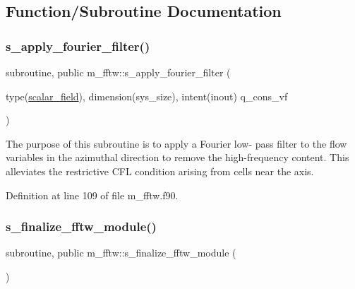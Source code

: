 \subsection{Function/\+Subroutine Documentation}
\mbox{\label{namespacem__fftw_ada93950a5527dfe2a35cc4f4ba77cb96}} 
\subsubsection{\texorpdfstring{s\+\_\+apply\+\_\+fourier\+\_\+filter()}{s\_apply\_fourier\_filter()}}
{\footnotesize\ttfamily subroutine, public m\+\_\+fftw\+::s\+\_\+apply\+\_\+fourier\+\_\+filter (\begin{DoxyParamCaption}\item[{type(\hyperlink{structm__derived__types_1_1scalar__field}{scalar\+\_\+field}), dimension(sys\+\_\+size), intent(inout)}]{q\+\_\+cons\+\_\+vf }\end{DoxyParamCaption})}



The purpose of this subroutine is to apply a Fourier low-\/ pass filter to the flow variables in the azimuthal direction to remove the high-\/frequency content. This alleviates the restrictive C\+FL condition arising from cells near the axis. 



Definition at line 109 of file m\+\_\+fftw.\+f90.

\mbox{\label{namespacem__fftw_a0666fa4d38fb46540fd108b76e835b45}} 
\subsubsection{\texorpdfstring{s\+\_\+finalize\+\_\+fftw\+\_\+module()}{s\_finalize\_fftw\_module()}}
{\footnotesize\ttfamily subroutine, public m\+\_\+fftw\+::s\+\_\+finalize\+\_\+fftw\+\_\+module (\begin{DoxyParamCaption}{ }\end{DoxyParamCaption})}




